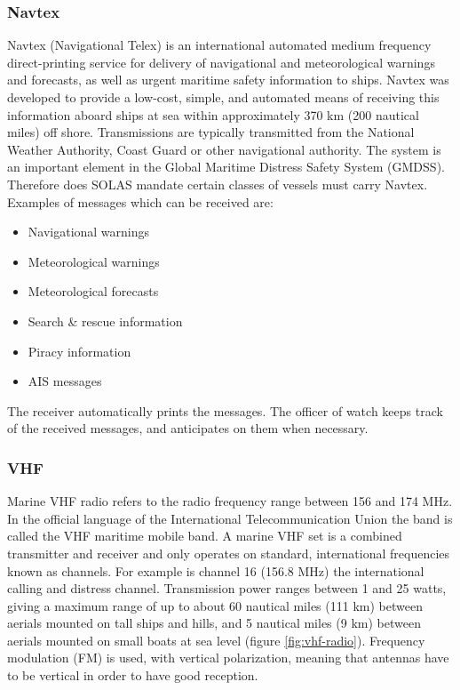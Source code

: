 \subsubsection{\acf{Navtex}}
Navtex (Navigational Telex) is an international automated medium frequency direct-printing service for delivery of navigational and meteorological warnings and forecasts, as well as urgent maritime safety information to ships. Navtex was developed to provide a low-cost, simple, and automated means of receiving this information aboard ships at sea within approximately 370 km (200 nautical miles) off shore.
Transmissions are typically transmitted from the National Weather Authority, Coast Guard or other navigational authority.
The system is an important element in the Global Maritime Distress Safety System (GMDSS). Therefore does \ac{SOLAS} mandate certain classes of vessels must carry Navtex.
Examples of messages which can be received are:
\begin{multicols}{2}
	\begin{itemize}
		\item Navigational warnings
		\item Meteorological warnings
		\item Meteorological forecasts
		\item Search \& rescue information
		\item Piracy information
		\item \ac{AIS} messages
	\end{itemize}
\end{multicols}
The receiver automatically prints the messages. The officer of watch keeps track of the received messages, and anticipates on them when necessary.

\subsubsection{\acf{VHF}}
Marine VHF radio refers to the radio frequency range between 156 and 174 MHz. In the official language of the International Telecommunication Union the band is called the VHF maritime mobile band.
A marine VHF set is a combined transmitter and receiver and only operates on standard, international frequencies known as channels. For example is channel 16 (156.8 MHz) the international calling and distress channel. Transmission power ranges between 1 and 25 watts, giving a maximum range of up to about 60 nautical miles (111 km) between aerials mounted on tall ships and hills, and 5 nautical miles (9 km) between aerials mounted on small boats at sea level (figure \ref{fig:vhf-radio}). Frequency modulation (FM) is used, with vertical polarization, meaning that antennas have to be vertical in order to have good reception.

